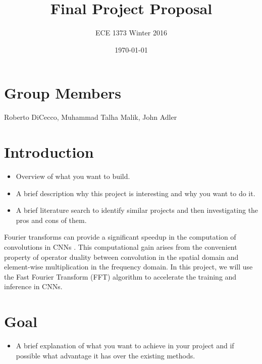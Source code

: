 \documentclass[conference,compsoc]{IEEEtran/IEEEtran}
\title{\bf Final Project Proposal}
\author{ECE 1373 Winter 2016}
\date{\today}
\begin{document}
\maketitle

\section{Group Members}
Roberto DiCecco, Muhammad Talha Malik, John Adler

\section{Introduction}
\begin{itemize}
\item Overview of what you want to build.
\item A brief description why this project is interesting and why you want to do it.
\item A brief literature search to identify similar projects and then investigating the pros and cons of them.
\end{itemize}

Fourier transforms can provide a significant speedup in the computation of convolutions in CNNs \cite{FFT1, FFT2}. This computational gain arises from the convenient property of operator duality between convolution in the spatial domain and element-wise multiplication in the frequency domain. In this project, we will use the Fast Fourier Transform (FFT) algorithm to accelerate the training and inference in CNNs.


\section{Goal}
\begin{itemize}
\item
A brief explanation of what you want to achieve in your project and if possible what
advantage it has over the existing methods.
\end{itemize}
\end{document}
